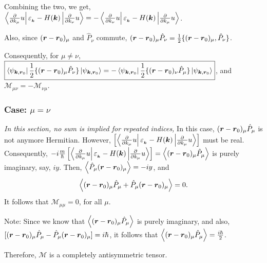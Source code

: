 \documentclass{report}
\renewcommand\vec[1]{\ensuremath\boldsymbol{#1}} %
\begin{document}
Combining the two, we get, $\bra{\frac{\partial}{\partial k_\mu} u}  \varepsilon_{_{\vec{k}}} - H(\vec{k}) \ket{\frac{\partial}{\partial k_\nu}u} = -  \bra{\frac{\partial}{\partial k_\nu} u}  \varepsilon_{_{\vec{k}}} - H(\vec{k}) \ket{\frac{\partial}{\partial k_\mu}u}$.

Also, since $(\vec{r} - \vec{r}_0)_\mu$ and $ \hat{P}_\nu$ commute, $(\vec{r} - \vec{r}_0)_\mu  \hat{P}_\nu =\frac{1}{2} \{ (\vec{r} - \vec{r}_0)_\mu, \hat{P}_\nu \}$.

Consequently, for $\mu \neq \nu$, $\boxed{\bra{\psi_{\vec{k},\vec{r}_0}} \frac{1}{2}\{(\vec{r} - \vec{r}_0)_\mu \hat{P}_\nu\} \ket{\psi_{\vec{k},\vec{r}_0}} = - \bra{\psi_{\vec{k},\vec{r}_0}} \frac{1}{2}\{(\vec{r} - \vec{r}_0)_\nu \hat{P}_\mu\} \ket{\psi_{\vec{k},\vec{r}_0}}}$, and $\boxed{\mathcal{M}_{\mu \nu} = -\mathcal{M}_{\nu \mu}}$.

\subsubsection{Case: $\mu = \nu$}
\textit{In this section, no sum is implied for repeated indices,}
In this case, $(\vec{r} - \vec{r}_0)_\mu \hat{P}_\mu$ is not anymore Hermitian. However, $\left[\bra{\frac{\partial}{\partial k_\mu} u}  \varepsilon_{_{\vec{k}}} - H(\vec{k}) \ket{\frac{\partial}{\partial k_\mu}u}\right]$ must be real. Consequently, $-i \frac{m}{\hbar} \left[\bra{\frac{\partial}{\partial k_\mu} u}  \varepsilon_{_{\vec{k}}} - H(\vec{k}) \ket{\frac{\partial}{\partial k_\mu}u}\right] = \expval{(\vec{r} - \vec{r}_0)_\mu \hat{P}_\mu}$ is purely imaginary, say, $iy$.
Then, $\expval{\hat{P}_\mu (\vec{r} - \vec{r}_0)_\mu } = -iy$, and $$\expval{(\vec{r} - \vec{r}_0)_\mu \hat{P}_\mu + \hat{P}_\mu (\vec{r} - \vec{r}_0)_\mu  } = 0.$$
It follows that $\boxed{\mathcal{M}_{\mu \mu} = 0}$, for all $\mu$.

Note: Since we know that $\expval{(\vec{r} - \vec{r}_0)_\mu \hat{P}_\mu}$ is purely imaginary, and also, $[(\vec{r} - \vec{r}_0)_\mu \hat{P}_\mu - \hat{P}_\mu (\vec{r} - \vec{r}_0)_\mu] = i\hbar$, it follows that $\expval{(\vec{r} - \vec{r}_0)_\mu \hat{P}_\mu} = \frac{i\hbar}{2}$.

Therefore, $\mathcal{M}$ is a completely antisymmetric tensor.
\end{document}
